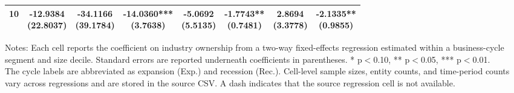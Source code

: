 \begin{table}[!htbp]
\begin{threeparttable}
\begin{subtable}[t]{\textwidth}
\begin{tabular}{@{}lccccccc@{}}
10 & \shortstack{-12.9384\\(22.8037)} & \shortstack{-34.1166\\(39.1784)} & \shortstack{-14.0360***\\(3.7638)} & \shortstack{-5.0692\\(5.5135)} & \shortstack{-1.7743**\\(0.7481)} & \shortstack{2.8694\\(3.3778)} & \shortstack{-2.1335**\\(0.9855)} \\
\bottomrule
\end{tabular}
\end{subtable}
\vspace{0.35em}
\noindent\parbox{\textwidth}{\footnotesize
Notes: Each cell reports the coefficient on industry ownership from a two-way fixed-effects regression estimated within a business-cycle segment and size decile. Standard errors are reported underneath coefficients in parentheses. * p$<$0.10, ** p$<$0.05, *** p$<$0.01.\\
The cycle labels are abbreviated as expansion (Exp.) and recession (Rec.). Cell-level sample sizes, entity counts, and time-period counts vary across regressions and are stored in the source CSV. A dash indicates that the source regression cell is not available.
}
\end{threeparttable}
\end{table}
